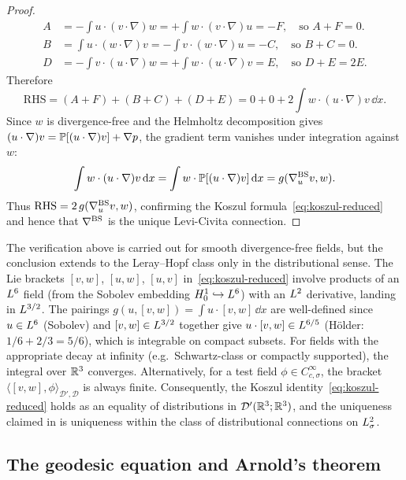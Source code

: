 \begin{proof}
\begin{align*}
    A &= -\int u\cdot(v\cdot\nabla)w = +\int w\cdot(v\cdot\nabla)u = -F,
    \quad\text{so } A + F = 0. \\
    B &= \int u\cdot(w\cdot\nabla)v = -\int v\cdot(w\cdot\nabla)u = -C,
    \quad\text{so } B + C = 0. \\
    D &= -\int v\cdot(u\cdot\nabla)w = +\int w\cdot(u\cdot\nabla)v = E,
    \quad\text{so } D + E = 2E.
  \end{align*}
  Therefore
  \[
    \mathrm{RHS} = (A + F) + (B + C) + (D + E) = 0 + 0 + 2\int w\cdot(u\cdot\nabla)v\,\dd x.
  \]
  Since $w$ is divergence-free and the Helmholtz decomposition gives
  $(u\cdot\nabla)v = \mathbb{P}[(u\cdot\nabla)v] + \nabla p$, the gradient term
  vanishes under integration against $w$:
  \[
    \int w\cdot(u\cdot\nabla)v\,\mathrm{d} x = \int w\cdot\mathbb{P}[(u\cdot\nabla)v]\,\mathrm{d} x
    = g(\nabla^{\mathrm{BS}}_u v, w).
  \]
  Thus $\mathrm{RHS} = 2\,g(\nabla^{\mathrm{BS}}_u v, w)$, confirming the Koszul
  formula~\eqref{eq:koszul-reduced} and hence that $\nabla^{\mathrm{BS}}$ is the unique
  Levi-Civita connection.
\end{proof}

\begin{remark}\label{rem:koszul-distributional}
  The verification above is carried out for smooth divergence-free fields, but the
  conclusion extends to the Leray--Hopf class only in the distributional sense.
  The Lie brackets $[v,w]$, $[u,w]$, $[u,v]$ in~\eqref{eq:koszul-reduced} involve
  products of an $L^{6}$ field (from the Sobolev embedding $H^{1}_0\hookrightarrow L^{6}$)
  with an $L^{2}$ derivative, landing in $L^{3/2}$.  The pairings $g(u,[v,w]) = \int u \cdot [v,w]\,\dd x$ are well-defined since
  $u \in L^{6}$ (Sobolev) and $[v,w] \in L^{3/2}$ together give $u\cdot[v,w] \in
  L^{6/5}$ (H\"{o}lder: $1/6 + 2/3 = 5/6$), which is integrable on compact subsets.
  For fields with the appropriate decay at infinity (e.g.\ Schwartz-class or compactly
  supported), the integral over $\mathbb{R}^3$ converges.  Alternatively, for a test field
  $\phi \in C^\infty_{c,\sigma}$, the bracket $\langle [v,w], \phi
  \rangle_{\mathcal{D}',\mathcal{D}}$ is always finite.  Consequently,
  the Koszul identity~\eqref{eq:koszul-reduced} holds as an equality of distributions
  in $\mathcal{D}'(\mathbb{R}^3;\mathbb{R}^3)$, and the uniqueness claimed in 
  is uniqueness within the class of distributional connections on $L^{2}_\sigma$.
\end{remark}

\subsection{The geodesic equation and Arnold's theorem}

